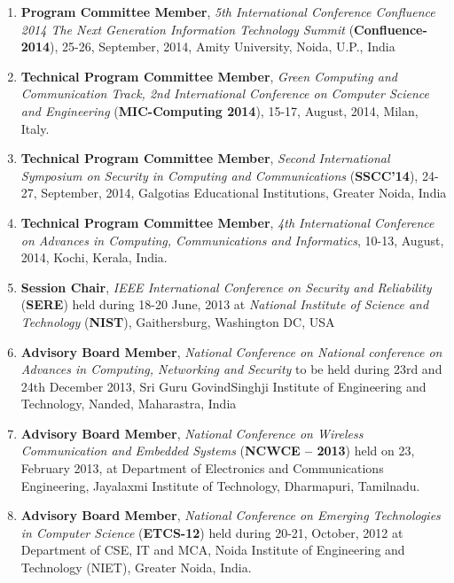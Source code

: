 \begin{enumerate}
\item
\textbf{Program Committee Member}, \textit{5th International Conference Confluence 2014 The Next Generation Information Technology Summit} (\textbf{Confluence-2014}), 25-26, September, 2014, Amity University, Noida, U.P., India

\item
\textbf{Technical Program Committee Member}, \textit{Green Computing and Communication Track, 2nd International Conference on Computer Science and Engineering} (\textbf{MIC-Computing 2014}), 15-17, August, 2014, Milan, Italy.

\item
\textbf{Technical Program Committee Member},\textit{ Second International Symposium on Security in Computing and Communications} (\textbf{SSCC’14}), 24-27, September, 2014, Galgotias Educational Institutions, Greater Noida, India

\item
\textbf{Technical Program Committee Member}, \textit{4th International Conference on Advances in Computing, Communications and Informatics}, 10-13, August, 2014, Kochi, Kerala, India.

\item
\textbf{Session Chair}, \textit{IEEE International Conference on Security and Reliability} (\textbf{SERE}) held during 18-20 June, 2013 at\textit{ National Institute of Science and Technology} (\textbf{NIST}), Gaithersburg, Washington DC, USA

\item
\textbf{Advisory Board Member}, \textit{National Conference on National conference on Advances in Computing, Networking and Security} to be held during 23rd and 24th December 2013, Sri Guru GovindSinghji Institute of Engineering and Technology, Nanded, Maharastra, India

\item
\textbf{Advisory Board Member}, \textit{National Conference on Wireless Communication and Embedded Systems} (\textbf{NCWCE – 2013}) held on 23, February 2013, at Department of Electronics and Communications Engineering, Jayalaxmi Institute of Technology, Dharmapuri, Tamilnadu. 

\item
\textbf{Advisory Board Member}, \textit{National Conference on Emerging Technologies in Computer Science}  (\textbf{ETCS-12})  held during 20-21, October, 2012 at Department of CSE, IT and MCA, Noida Institute of Engineering and Technology (NIET), Greater Noida, India.


\end{enumerate}
